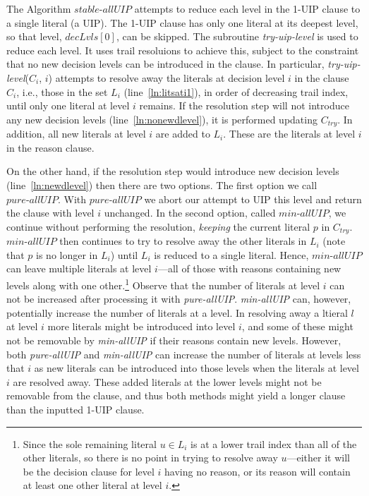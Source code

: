 \documentclass[runningheads]{llncs}
\newcommand{\allUip}{\textit{stable-allUIP}}
\newcommand{\tryuiplevel}{\textit{try-uip-level}\xspace}
\newcommand{\allUipPure}{\textit{pure-allUIP}\xspace}
\newcommand{\allUipMin}{\textit{min-allUIP}\xspace}
\newcommand{\dlevels}{\ensuremath{\mathit{decLvls}}}
\newcommand{\ctry}{C_{\mathit{try}}}
\begin{document}
The Algorithm $\allUip$ attempts to reduce each level in the 1-UIP
clause to a single literal (a UIP). The 1-UIP clause has only one
literal at its deepest level, so that level, $\dlevels[0]$, can be
skipped. The subroutine \tryuiplevel is used to reduce each level. It
uses trail resoluions to achieve this, subject to the constraint that
no new decision levels can be introduced in the clause. In particular,
\tryuiplevel($C_i$, $i$) attempts to resolve away the literals at
decision level $i$ in the clause $C_i$, i.e., those in the set $L_i$
(line~\ref{ln:litsati1}), in order of decreasing trail index, until
only one literal at level $i$ remains. If the resolution step will not
introduce any new decision levels (line~\ref{ln:nonewdlevel}), it is
performed updating $\ctry$. In addition, all new literals at level $i$
are added to $L_i$. These are the literals at level $i$ in the reason
clause.

On the other hand, if the resolution step would introduce new decision
levels (line~\ref{ln:newdlevel}) then there are two options.  The
first option we call $\allUipPure$. With $\allUipPure$ we abort our
attempt to UIP this level and return the clause with level $i$
unchanged. In the second option, called $\allUipMin$, we continue
without performing the resolution, \textit{keeping} the current
literal $p$ in $\ctry$. $\allUipMin$ then continues to try to resolve
away the other literals in $L_i$ (note that $p$ is no longer in $L_i$)
until $L_i$ is reduced to a single literal. Hence, $\allUipMin$ can
leave multiple literals at level $i$---all of those with reasons
containing new levels along with one other.\footnote{Since the sole
  remaining literal $u\in L_i$ is at a lower trail index than all of
  the other literals, so there is no point in trying to resolve away
  $u$---either it will be the decision clause for level $i$ having no
  reason, or its reason will contain at least one other literal at
  level $i$.} Observe that the number of literals at level $i$ can not
be increased after processing it with \allUipPure. \allUipMin can,
however, potentially increase the number of literals at a level. In
resolving away a ltieral $l$ at level $i$ more literals might be
introduced into level $i$, and some of these might not be removable by
\allUipMin if their reasons contain new levels. However, both
\allUipPure and \allUipMin can increase the number of literals at
levels less that $i$ as new literals can be introduced into those
levels when the literals at level $i$ are resolved away. These added
literals at the lower levels might not be removable from the clause,
and thus both methods might yield a longer clause than the inputted
1-UIP clause.
\end{document}
